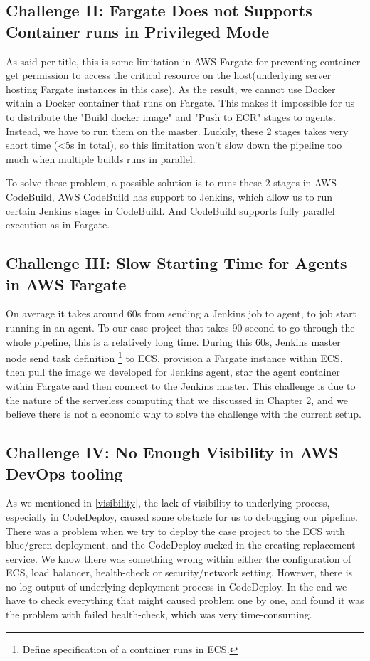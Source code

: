 \subsection{Challenge II: Fargate Does not Supports Container runs in Privileged Mode}
As said per title, this is some limitation in AWS Fargate for preventing container get permission to access the critical resource on the host(underlying server hosting Fargate instances in this case). As the result, we cannot use Docker within a Docker container that runs on Fargate. This makes it impossible for us to distribute the "Build docker image" and "Push to ECR" stages to agents. Instead, we have to run them on the master. Luckily, these 2 stages takes very short time (<5s in total), so this limitation won't slow down the pipeline too much when multiple builds runs in parallel.
\par
To solve these problem, a possible solution is to runs these 2 stages in AWS CodeBuild, AWS CodeBuild has support to Jenkins, which allow us to run certain Jenkins stages in CodeBuild. And CodeBuild supports fully parallel execution as in Fargate.
\subsection{Challenge III: Slow Starting Time for Agents in AWS Fargate}
On average it takes around 60s from sending a Jenkins job to agent, to job start running in an agent. To our case project that takes 90 second to go through the whole pipeline, this is a relatively long time. During this 60s, Jenkins master node send task definition \footnote{Define specification of a container runs in ECS.} to ECS, provision a Fargate instance within ECS, then pull the image we developed for Jenkins agent, star the agent container within Fargate and then connect to the Jenkins master. This challenge is due to the nature of the serverless computing that we discussed in Chapter 2, and we believe there is not a economic why to solve the challenge with the current setup.
\subsection{Challenge IV: No Enough Visibility in AWS DevOps tooling}
As we mentioned in \ref{visibility}, the lack of visibility to underlying process, especially in CodeDeploy, caused some obstacle for us to debugging our pipeline. There was a problem when we try to deploy the case project to the ECS with blue/green deployment, and the CodeDeploy sucked in the creating replacement service. We know there was something wrong within either the configuration of ECS, load balancer, health-check or security/network setting. However, there is no log output of underlying deployment process in CodeDeploy. In the end we have to check everything that might caused problem one by one, and found it was the problem with failed health-check, which was very time-consuming.